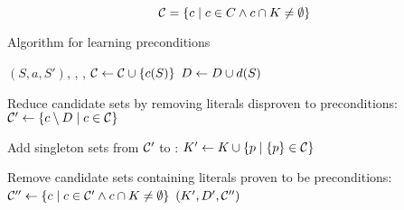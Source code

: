 \documentclass[\master/Master.tex]{subfiles}
\begin{document}
\begin{equation} \label{eq:removeKnown}
    \mathcal{C} = \left\{ c \; | \; c \in C \land c \cap K \neq \emptyset \right\}
\end{equation}

\begin{algorithm}
    \caption{Algorithm for learning preconditions}\label{algo:precondLearn}
    \begin{algorithmic}
         {$\left(S, a, S'\right)$, \Dsp, \Pro, \cset}
                \State $\mathcal{C} \gets \mathcal{C} \cup \{ c(S) \}$
                \State $D \gets D \cup d(S)$
            \EndIf

            \State Reduce candidate sets by removing literals disproven to preconditions:
            \State $\mathcal{C}' \gets \left\{ c \setminus D \; | \; c \in \mathcal{C} \right\}$

            \State Add singleton sets from $\mathcal{C}'$ to \Pro:
            \State $K' \gets K \cup \left\{ p \; | \; \{ p \} \in \mathcal{C} \right\}$

            \State Remove candidate sets containing literals proven to be preconditions:
            \State $\mathcal{C}'' \gets \left\{ c \; | \; c \in \mathcal{C}' \land c \cap K \neq \emptyset \right\}$
            \State \Return $(K', D', \mathcal{C}'')$
        \EndFunction%
    \end{algorithmic}
\end{algorithm}
\end{document}
